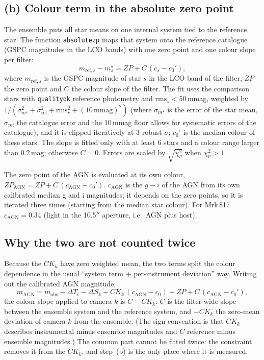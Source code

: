 \documentclass[10pt,a4paper,oneside]{report}
\renewcommand{\_}{\oldunderscore\allowbreak}
\begin{document}
\subsection{(b) Colour term in the absolute zero point}

The ensemble puts all star means on one internal system tied to the reference star. The function
\texttt{absolute\_zp} maps that system onto the reference catalogue (GSPC magnitudes in the LCO bands)
with one zero point and one colour slope per filter:
\begin{equation}
  m_{\mathrm{ref},s} - m^\star_s = ZP + C\,(c_s - c_0') ,
  \label{eq:abszp}
\end{equation}
where $m_{\mathrm{ref},s}$ is the GSPC magnitude of star $s$ in the LCO band of the filter, $ZP$ the
zero point and $C$ the colour slope of the filter. The fit uses the comparison stars with
\texttt{quality\_ok} reference photometry and
$\mathrm{rms}_\star<50$\,mmag, weighted by $1/(\sigma_{m^\star}^2+\sigma_\mathrm{ref}^2+\mathrm{rms}_\star^2+(10\,\mathrm{mmag})^2)$
(where $\sigma_{m^\star}$ is the error of the star mean, $\sigma_\mathrm{ref}$ the catalogue error and the
10\,mmag floor allows for systematic errors of the catalogue), and it is clipped iteratively at 3
robust $\sigma$; $c_0'$ is the median colour of these stars. The slope is
fitted only with at least 6 stars and a colour range larger than 0.2\,mag; otherwise $C=0$. Errors
are scaled by $\sqrt{\chi^2_\nu}$ when $\chi^2_\nu>1$.

The zero point of the AGN is evaluated at its own colour, $ZP_\mathrm{AGN} = ZP + C\,(c_\mathrm{AGN}-c_0')$.
$c_\mathrm{AGN}$ is the $g-i$ of the AGN from its own calibrated median g and i magnitudes; it depends on
the zero points, so it is iterated three times (starting from the median star colour). For Mrk\,817
$c_\mathrm{AGN} = 0.34$ (light in the 10.5$''$ aperture, i.e.\ AGN plus host).

\subsection{Why the two are not counted twice}

Because the $CK_k$ have zero weighted mean, the two terms split the colour dependence in the usual
``system term + per-instrument deviation'' way. Writing out the calibrated AGN magnitude,
\begin{equation}
  m_\mathrm{AGN} = m_\mathrm{obs} - \Delta T_t - \Delta S_k - CK_k\,(c_\mathrm{AGN}-c_0) + ZP + C\,(c_\mathrm{AGN}-c_0') ,
\end{equation}
the colour slope applied to camera $k$ is $C - CK_k$: $C$ is the filter-wide slope between the
ensemble system and the reference system, and $-CK_k$ the zero-mean deviation of camera $k$ from the
ensemble. (The sign convention is that $CK_k$ describes instrumental minus ensemble magnitudes and $C$
reference minus ensemble magnitudes.) The common part cannot be fitted twice: the constraint removes it
from the $CK_k$, and step~(b) is the only place where it is measured.
\end{document}
